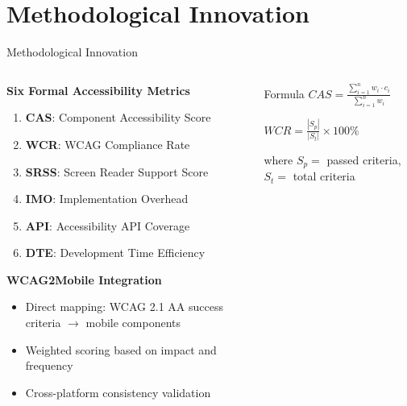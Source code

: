 \documentclass[10pt,aspectratio=169]{beamer}
\begin{document}
\section{Methodological Innovation}

\begin{frame}{Methodological Innovation}
    \begin{columns}[c]
        \begin{column}{0.65\textwidth}
            \textbf{Six Formal Accessibility Metrics}
            \begin{enumerate}
                \item \textbf{CAS}: Component Accessibility Score
                \item \textbf{WCR}: WCAG Compliance Rate
                \item \textbf{SRSS}: Screen Reader Support Score
                \item \textbf{IMO}: Implementation Overhead
                \item \textbf{API}: Accessibility API Coverage
                \item \textbf{DTE}: Development Time Efficiency
            \end{enumerate}
            
            \vspace{0.3cm}
            
            \textbf{WCAG2Mobile Integration}
            \begin{itemize}
                \item Direct mapping: WCAG 2.1 AA success criteria $\to$ mobile components
                \item Weighted scoring based on impact and frequency
                \item Cross-platform consistency validation
            \end{itemize}
        \end{column}
        \begin{column}{0.3\textwidth}
            \begin{block}{Formula}
                \small
                $CAS = \frac{\sum_{i=1}^{n} w_i \cdot c_i}{\sum_{i=1}^{n} w_i}$
                
                \vspace{0.2cm}
                
                $WCR = \frac{|S_p|}{|S_t|} \times 100\%$
                
                where $S_p =$ passed criteria, $S_t =$ total criteria
            \end{block}
        \end{column}
    \end{columns}
\end{frame}
\end{document}
